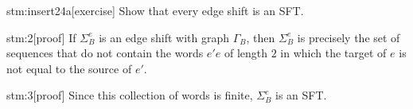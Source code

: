 
\begin{stm}{stm:insert24a}[exercise]
Show that every edge shift is an SFT.
\end{stm}

\begin{stm}{stm:2}[proof]
If $\Sigma_B^e$ is an edge shift with graph $\Gamma_B$, then $\Sigma_B^e$ is precisely the set of sequences that do not contain the words $e'e$ of length $2$ in which the target of $e$ is not equal to the source of $e'$.
\end{stm}

\begin{stm}{stm:3}[proof]
Since this collection of words is finite, $\Sigma_B^e$ is an SFT.
\end{stm}